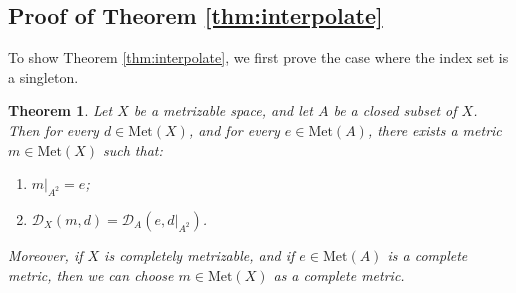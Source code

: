 \documentclass[a4paper, 12pt]{amsart}
\theoremstyle{plain}
\newtheorem{thm}{Theorem}[section]
\theoremstyle{definition}
\theoremstyle{remark}
\newcommand{\met}[1]{\mathrm{Met}(#1)}
\newcommand{\metdis}{\mathcal{D}}
\begin{document}
\subsection{Proof of Theorem \ref{thm:interpolate}}


To show Theorem \ref{thm:interpolate}, 
we first prove the case 
where the index set is a singleton. 
\begin{thm}\label{thm:ext241009}
Let
 $X$ 
 be a metrizable space,  
and let 
$A$ 
be a closed subset of
 $X$.
Then  
for every  
$d\in \met{X}$, 
and for every  
$e\in \met{A}$, 
there exists  a metric 
$m\in \met{X}$ 
such that:
\begin{enumerate}
	\item $m|_{A^2}=e$; 
	\item $\metdis_{X}(m, d)= \metdis_{A}(e, d|_{A^2})$. 
\end{enumerate}
Moreover, 
if 
$X$ 
is completely metrizable,  
and if 
$e\in \met{A}$ 
is  a complete metric, 
then we can choose
 $m\in \met{X}$ as a complete metric. 
\end{thm}
\end{document}

